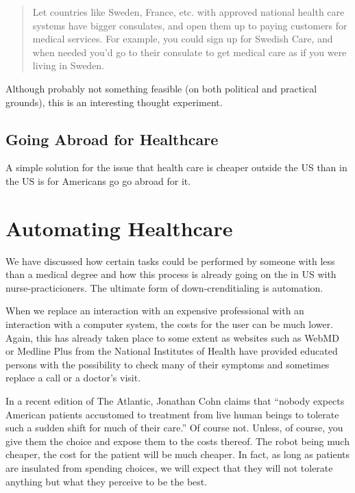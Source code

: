 \begin{quote}
Let countries like Sweden, France, etc. with approved national health care
systems have bigger consulates, and open them up to paying customers for
medical services. For example, you could sign up for Swedish Care, and when
needed you’d go to their consulate to get medical care as if you were living in
Sweden.
\end{quote}

Although probably not something feasible (on both political and practical
grounds), this is an interesting thought experiment.

\subsection{Going Abroad for Healthcare}

A simple solution for the issue that health care is cheaper outside the US than
in the US is for Americans go go abroad for it.

\section{Automating Healthcare}

We have discussed how certain tasks could be performed by someone with less
than a medical degree and how this process is already going on the in US with
nurse-practicioners. The ultimate form of down-crenditialing is automation.

When we replace an interaction with an expensive professional with an
interaction with a computer system, the costs for the user can be much lower.
Again, this has already taken place to some extent as websites such as WebMD or
Medline Plus from the National Institutes of Health have provided educated
persons with the possibility to check many of their symptoms and sometimes
replace a call or a doctor's visit.

In a recent edition of The Atlantic, Jonathan Cohn claims that ``nobody expects
American patients accustomed to treatment from live human beings to tolerate
such a sudden shift for much of their care.'' Of course not. Unless,
of course, you give them the choice and expose them to the costs thereof. The
robot being much cheaper, the cost for the patient will be much cheaper. In
fact, as long as patients are insulated from spending choices, we will expect
that they will not tolerate anything but what they perceive to be the best.

